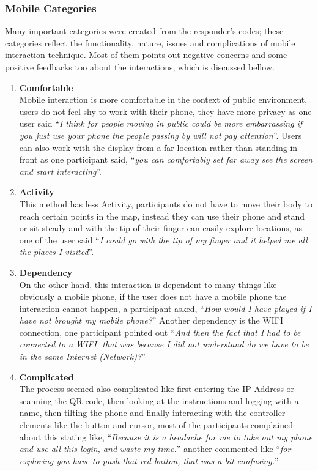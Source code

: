 \subsubsection{Mobile Categories}
Many important categories were created from the responder's codes; these categories reflect the functionality, nature, issues and complications of mobile interaction technique. Most of them points out negative concerns and some positive feedbacks too about the interactions, which is discussed bellow.
\begin{enumerate}
\item	\textbf{Comfortable} \\
	Mobile interaction is more comfortable in the context of public environment, users do not feel shy to work with their phone, they have more privacy as one user said ``\emph{I think for people moving in public could be more embarrassing if you just use your phone the people passing by will not pay attention}''. Users can also work with the display from a far location rather than standing in front as one participant said, ``\emph{you can comfortably set far away see the screen and start interacting}''.
\item	\textbf{Activity} \\
	This method has less Activity, participants do not have to move their body to reach certain points in the map, instead they can use their phone and stand or sit steady and with the tip of their finger can easily explore locations, as one of the user said ``\emph{I could go with the tip of my finger and it helped me all the places I visited}''.
\item	\textbf{Dependency}\\
	On the other hand, this interaction is dependent to many things like obviously a mobile phone, if the user does not have a mobile phone the interaction cannot happen, a participant asked, ``\emph{How would I have played if I have not brought my mobile phone?}'' Another dependency is the WIFI connection, one participant pointed out ``\emph{And then the fact that I had to be connected to a WIFI, that was because I did not understand do we have to be in the same Internet (Network)?}'' 

\item	\textbf{Complicated}\\
The process seemed also complicated like first entering the IP-Address or scanning the QR-code, then looking at the instructions and logging with a name, then tilting the phone and finally interacting with the controller elements like the button and cursor, most of the participants complained about this stating like, ``\emph{Because it is a headache for me to take out my phone and use all this login, and waste my time.}'' another commented like ``\emph{for exploring you have to push that red button, that was a bit confusing.}''



\end{enumerate}
